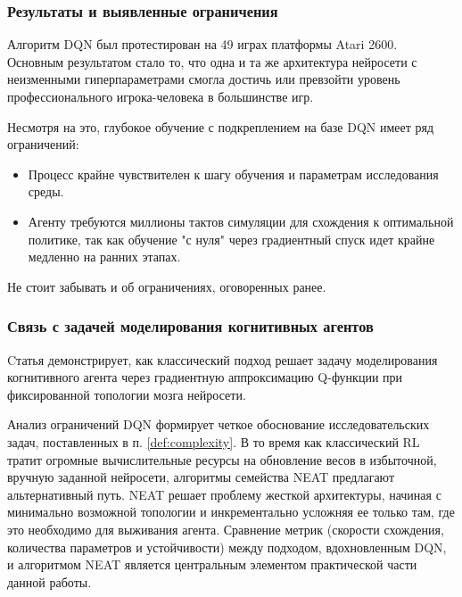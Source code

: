 \subsubsection{Результаты и выявленные ограничения}

Алгоритм DQN был протестирован на 49 играх платформы Atari 2600. Основным результатом стало то, что одна и та же архитектура нейросети с неизменными гиперпараметрами смогла достичь или превзойти уровень профессионального игрока-человека в большинстве игр.

Несмотря на это, глубокое обучение с подкреплением на базе DQN имеет ряд ограничений:

\begin{itemize}

  \item Процесс крайне чувствителен к шагу обучения и параметрам исследования среды.

  \item Агенту требуются миллионы тактов симуляции для схождения к оптимальной политике, так как обучение "с нуля" через градиентный спуск идет крайне медленно на ранних этапах.

\end{itemize}

Не стоит забывать и об ограничениях, оговоренных ранее.

\subsubsection{Связь с задачей моделирования когнитивных агентов}

Cтатья \cite{mnih2015humanlevel} демонстрирует, как классический подход решает задачу моделирования когнитивного агента через градиентную аппроксимацию Q-функции при фиксированной топологии мозга нейросети.

Анализ ограничений DQN формирует четкое обоснование исследовательских задач, поставленных в п. \ref{def:complexity}. В то время как классический RL тратит огромные вычислительные ресурсы на обновление весов в избыточной, вручную заданной нейросети, алгоритмы семейства NEAT предлагают альтернативный путь. NEAT решает проблему жесткой архитектуры, начиная с минимально возможной топологии и инкрементально усложняя ее только там, где это необходимо для выживания агента. Сравнение метрик (скорости схождения, количества параметров и устойчивости) между подходом, вдохновленным DQN, и алгоритмом NEAT является центральным элементом практической части данной работы.